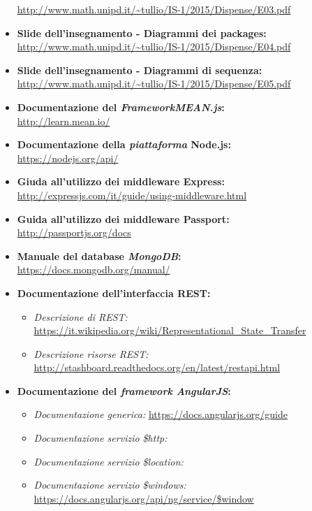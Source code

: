 \begin{itemize}
	\url{http://www.math.unipd.it/~tullio/IS-1/2015/Dispense/E03.pdf}
	\item \textbf{Slide dell'insegnamento - Diagrammi dei packages:} \\
	\url{http://www.math.unipd.it/~tullio/IS-1/2015/Dispense/E04.pdf}
	\item \textbf{Slide dell'insegnamento - Diagrammi di sequenza:} \\
	\url{http://www.math.unipd.it/~tullio/IS-1/2015/Dispense/E05.pdf}
	\item \textbf{Documentazione del \textit{FrameworkMEAN.js}:} \\
	\url{http://learn.mean.io/}
	\item \textbf{Documentazione della \textit{piattaforma} Node.js:} \\
	\url{https://nodejs.org/api/}
	\item \textbf{Giuda all'utilizzo dei middleware Express:} \\
	\url{http://expressjs.com/it/guide/using-middleware.html}
	\item \textbf{Guida all'utilizzo dei middleware Passport:} \\
	\url{http://passportjs.org/docs}
	\item \textbf{Manuale del database \textit{MongoDB}:} \\
	\url{https://docs.mongodb.org/manual/}
	\item \textbf{Documentazione dell'interfaccia REST:}
	\begin{itemize}
		\item \textit{Descrizione di REST:} \url{https://it.wikipedia.org/wiki/Representational_State_Transfer}
		\item \textit{Descrizione risorse REST:} \url{http://stashboard.readthedocs.org/en/latest/restapi.html}
	\end{itemize}
	\item \textbf{Documentazione del \textit{framework AngularJS}:} \\
	\begin{itemize}
		\item \textit{Documentazione generica:} \url{https://docs.angularjs.org/guide}
		\item \textit{Documentazione servizio \$http:} 
		\item \textit{Documentazione servizio \$location:} 
		\item \textit{Documentazione servizio \$windows:} \url{https://docs.angularjs.org/api/ng/service/$window}

\end{itemize}
\end{itemize}
